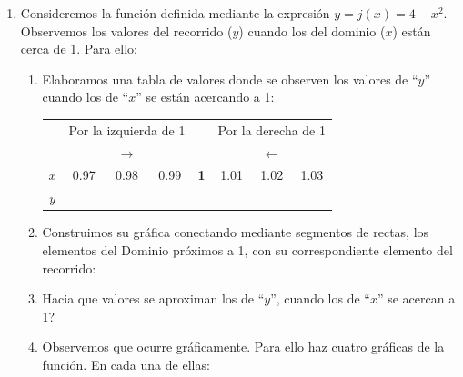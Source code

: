 \documentclass[10pt,twoside]{article}
\begin{document}
\begin{enumerate}
\begin{center}
\end{center}
\item Consideremos la función definida mediante la expresión $y=j(x)=4-x^{2}$. Observemos los valores del recorrido ($y$) cuando los del dominio ($x$) están cerca de 1. Para ello:
\begin{enumerate}
\item Elaboramos una tabla de valores donde se observen los valores de “$y$” cuando los de “$x$” se están
acercando a 1:
\begin{center}
\begin{tabular}{c|c|c|c|c|c|c|c|}
 & \multicolumn{3}{c|}{Por la izquierda de 1} &  &\multicolumn{3}{c}{Por la derecha de 1} \\
   & \multicolumn{3}{c|}{$\longrightarrow$} &  &\multicolumn{3}{c}{$\longleftarrow$} \\
\hline 
$x$ & 0.97 & 0.98 & 0.99 & \textbf{1} & 1.01 & 1.02 & 1.03 \\ 
\hline 
$y$ &  &  &  &  &  &  &  \\ 
\hline 
\end{tabular} 
\end{center}
\item Construimos su gráfica conectando mediante segmentos de rectas, los elementos del Dominio próximos a 1, con su correspondiente elemento del recorrido:
\begin{center}
\end{center}
\item Hacia que valores se aproximan los de “$y$”, cuando los de “$x$” se acercan a 1?
\item Observemos que ocurre gráficamente. Para ello haz cuatro gráficas de la función. En cada una de ellas:
\begin{itemize}

\end{itemize}
\end{enumerate}
\end{enumerate}
\end{document}
